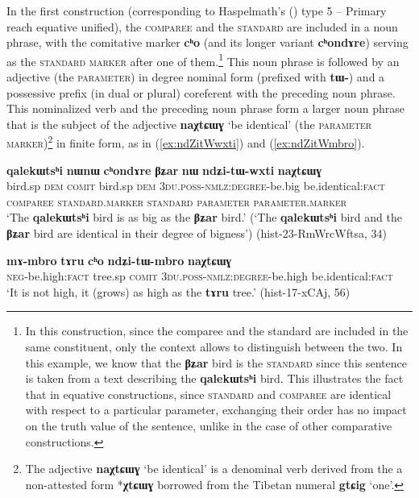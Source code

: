 \documentclass[oneside,a4paper,11pt]{article}
\newcommand{\ipa}[1]{{\phon\textbf{#1}}}
\newcommand{\forme}[2]{\ipa{#1} `#2'}
\begin{document}
In the first construction (corresponding to Haspelmath's (\citeyear{haspelmath17equative}) type 5 -- Primary reach equative unified), the \textsc{comparee} and the \textsc{standard} are included in a noun phrase, with the comitative marker \ipa{cʰo} (and its longer variant \ipa{cʰondɤre}) serving as the \textsc{standard marker} after one of them.\footnote{In this construction, since the comparee and the standard are included in the same constituent, only the context allows to distinguish between the two. In this example, we know that the \ipa{βʑar} bird is the \textsc{standard} since this sentence is taken from a text describing the \ipa{qalekɯtsʰi} bird. This illustrates the fact that in equative constructions, since \textsc{standard} and \textsc{comparee} are identical with respect to a particular parameter, exchanging their order has no impact on the truth value of the sentence, unlike in the case of other comparative constructions.} This noun phrase is followed by an adjective (the \textsc{parameter}) in degree nominal form (prefixed with \ipa{tɯ-}) and a possessive prefix (in dual or plural) coreferent with the preceding noun phrase. This nominalized verb and the preceding noun phrase form a larger noun phrase that is the subject of the adjective \forme{naχtɕɯɣ}{be identical} (the \textsc{parameter marker})\footnote{The adjective \forme{naχtɕɯɣ}{be identical} is a denominal verb derived from the a non-attested form *\ipa{χtɕɯɣ} borrowed from the Tibetan numeral \forme{gtɕig}{one}. } in finite form, as in (\ref{ex:ndZitWwxti}) and (\ref{ex:ndZitWmbro}).

\begin{exe}
\ex \label{ex:ndZitWwxti}
\glll
\ipa{qalekɯtsʰi} 	\ipa{nɯnɯ} 	\ipa{cʰondɤre} 	\ipa{βʑar} 	\ipa{nɯ} 	\ipa{ndʑi-tɯ-wxti} 	\ipa{naχtɕɯɣ} \\
bird.sp \textsc{dem} \textsc{comit} bird.sp \textsc{dem} \textsc{3du.poss-nmlz:degree}-be.big be.identical:\textsc{fact} \\
{\textsc{comparee}} { } \textsc{standard.marker} {\textsc{standard}} { } \textsc{parameter} \textsc{parameter.marker} \\
\glt `The \ipa{qalekɯtsʰi} bird is as big as the \ipa{βʑar} bird.' (`The \ipa{qalekɯtsʰi} bird and the \ipa{βʑar} bird are identical in their degree of bigness')  (hist-23-RmWrcWftsa, 34)
\end{exe}
 

\begin{exe}
\ex \label{ex:ndZitWmbro}
\gll 
\ipa{mɤ-mbro} 	\ipa{tɤru} 	\ipa{cʰo} 	\ipa{ndʑi-tɯ-mbro} 	\ipa{naχtɕɯɣ} \\
\textsc{neg}-be.high:\textsc{fact} tree.sp \textsc{comit} \textsc{3du.poss-nmlz:degree}-be.high be.identical:\textsc{fact} \\
\glt `It is not high, it (grows) as high as the \ipa{tɤru} tree.' (hist-17-xCAj, 56)
\end{exe}
\end{document}
